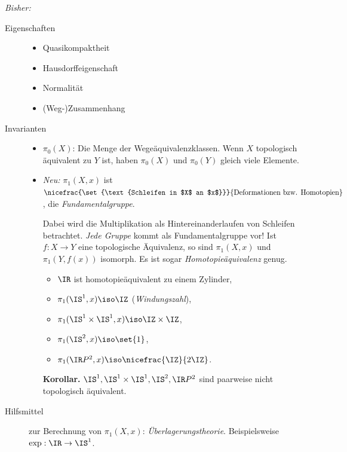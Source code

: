 \documentclass[language=ngerman]{TemplateLecture} %
\begin{document}
\emph{Bisher:}
\begin{description}
    \item[Eigenschaften] \begin{itemize}
        \item Quasikompaktheit
        \item Hausdorffeigenschaft
        \item Normalität
        \item (Weg-)Zusammenhang
    \end{itemize}
    \item[Invarianten] \begin{itemize}
        \item $\pi_0(X)$: Die Menge der Wegeäquivalenzklassen. Wenn $X$ topologisch äquivalent zu $Y$ ist, haben $\pi_0(X)$ und $\pi_0(Y)$ gleich viele Elemente.
        \item \emph{Neu:} $\pi_1(X,x)$ ist $\nicefrac{\set{\text{Schleifen in $X$ an $x$}}}{\text{Deformationen bzw. Homotopien}}$, die \emph{Fundamentalgruppe}.
        
        Dabei wird die Multiplikation als Hintereinanderlaufen von Schleifen betrachtet. \emph{Jede Gruppe} kommt als Fundamentalgruppe vor! Ist $f: X \to Y$ eine topologische Äquivalenz, so sind $\pi_1(X,x)$ und $\pi_1(Y,f(x))$ isomorph. Es ist sogar \emph{Homotopieäquivalenz} genug.
        \begin{example}\leavevmode
            \begin{itemize}
                \item $\IR$ ist homotopieäquivalent zu einem Zylinder,
                \item $\pi_1(\IS^1, x) \iso \IZ$ (\emph{Windungszahl}),
                \item $\pi_1(\IS^1 \times \IS^1, x) \iso \IZ \times \IZ$,
                \item $\pi_1(\IS^2, x) \iso \set{1}$,
                \item $\pi_1(\IR P^2, x) \iso \nicefrac{\IZ}{2\IZ}$.
            \end{itemize}
        \end{example}
        \textbf{Korollar.} $\IS^1, \IS^1 \times \IS^1, \IS^2, \IR P^2$ sind paarweise nicht topologisch äquivalent.
    \end{itemize}
    \item[Hilfsmittel] zur Berechnung von $\pi_1(X,x)$: \emph{Überlagerungstheorie}. Beispielsweise $\exp: \IR \to \IS^1$.
\end{description}
\end{document}
